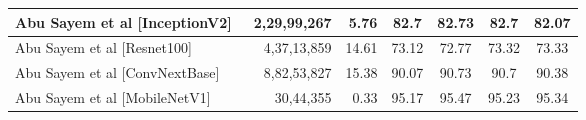 \begin{table}[htbp]
\begin{adjustbox}{width=\textwidth}
\begin{tabular}{||l||r||r||ccc||ccc||ccc||ccc||}
\hline
Abu Sayem et al [InceptionV2]~\cite{siam2023textilenet} & 2,29,99,267 & 5.76 & \multicolumn{3}{|c||}{82.7} & \multicolumn{3}{|c||}{82.73} & \multicolumn{3}{|c||}{82.7} & \multicolumn{3}{|c||}{82.07} \\
\hline
Abu Sayem et al [Resnet100]~\cite{siam2023textilenet} & 4,37,13,859 & 14.61 & \multicolumn{3}{|c||}{73.12} & \multicolumn{3}{|c||}{72.77} & \multicolumn{3}{|c||}{73.32} & \multicolumn{3}{|c||}{73.33} \\
\hline
Abu Sayem et al [ConvNextBase]~\cite{siam2023textilenet} & 8,82,53,827 & 15.38 & \multicolumn{3}{|c||}{90.07} & \multicolumn{3}{|c||}{90.73} & \multicolumn{3}{|c||}{90.7} & \multicolumn{3}{|c||}{90.38} \\
\hline
Abu Sayem et al [MobileNetV1]~\cite{siam2023textilenet} & 30,44,355 & 0.33 & \multicolumn{3}{|c||}{95.17} & \multicolumn{3}{|c||}{95.47} & \multicolumn{3}{|c||}{95.23} & \multicolumn{3}{|c||}{95.34} \\
\hline\hline
\end{tabular}
\end{adjustbox}
\end{table}

